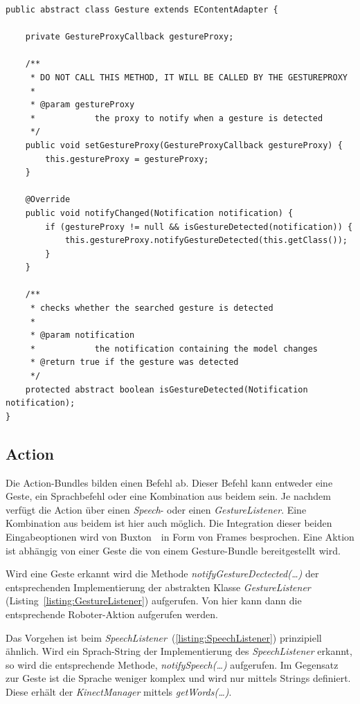 \par\smallskip
\lstset{language=Java}
\begin{lstlisting}[caption={Klasse Gesture}, label={listing:Gesture}]
public abstract class Gesture extends EContentAdapter {

	private GestureProxyCallback gestureProxy;

	/**
	 * DO NOT CALL THIS METHOD, IT WILL BE CALLED BY THE GESTUREPROXY
	 * 
	 * @param gestureProxy
	 *            the proxy to notify when a gesture is detected
	 */
	public void setGestureProxy(GestureProxyCallback gestureProxy) {
		this.gestureProxy = gestureProxy;
	}

	@Override
	public void notifyChanged(Notification notification) {
		if (gestureProxy != null && isGestureDetected(notification)) {
			this.gestureProxy.notifyGestureDetected(this.getClass());
		}
	}

	/**
	 * checks whether the searched gesture is detected
	 * 
	 * @param notification
	 *            the notification containing the model changes
	 * @return true if the gesture was detected
	 */
	protected abstract boolean isGestureDetected(Notification notification);
}
\end{lstlisting}
\par\smallskip

\subsection{Action}
\label{subsec:osgiaction}

Die Action-Bundles bilden einen Befehl ab. Dieser Befehl kann entweder eine Geste, ein Sprachbefehl oder eine Kombination aus beidem sein. 
Je nachdem verf\"ugt die Action \"uber einen \textit{Speech}- oder einen \textit{GestureListener}. Eine Kombination aus beidem ist hier 
auch m\"oglich. Die Integration dieser beiden Eingabeoptionen wird von Buxton~\cite{bib:buxton}~\footnotemark[4] in Form von Frames besprochen. 
Eine Aktion ist abh\"angig von einer Geste die von einem Gesture-Bundle bereitgestellt wird.

Wird eine Geste erkannt wird die Methode \textit{notifyGestureDectected(\ldots)} der entsprechenden Implementierung der abstrakten Klasse
\textit{GestureListener} (Listing~\ref{listing:GestureListener}) aufgerufen. Von hier kann dann die entsprechende Roboter-Aktion aufgerufen werden.

Das Vorgehen ist beim \textit{SpeechListener}~(\ref{listing:SpeechListener}) prinzipiell \"ahnlich. Wird ein Sprach-String der Implementierung
des \textit{SpeechListener} erkannt, so wird die entsprechende Methode, \textit{notifySpeech(\ldots)} aufgerufen. Im Gegensatz zur Geste ist die
Sprache weniger komplex und wird nur mittels Strings definiert. Diese erh\"alt der \textit{KinectManager} mittels \textit{getWords(\ldots)}.

